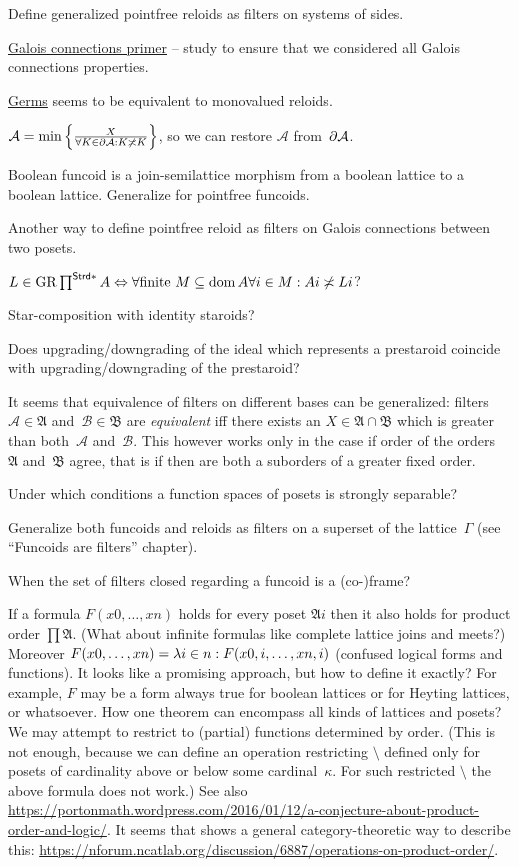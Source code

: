 \documentclass{amsart}
\begin{document}
Define generalized pointfree reloids as filters on systems of sides.

\href{https://www.math.ksu.edu/~strecker/primer.ps}{Galois connections primer} -- study to ensure that we considered all Galois connections properties.

\href{https://en.wikipedia.org/wiki/Germ (mathematics)}{Germs} seems to be equivalent to monovalued reloids.

$\mathcal{A} = \min\left\{ \frac{X}{\forall K\in\partial\mathcal{A}:K\not\asymp K}\right\}$, so we can restore $\mathcal{A}$ from~$\partial\mathcal{A}$.

Boolean funcoid is a join-semilattice morphism from a boolean lattice to a boolean lattice. Generalize for pointfree funcoids.

Another way to define pointfree reloid as filters on Galois connections between two posets.

$L \in \operatorname{GR} \prod^{\mathsf{Strd} \ast} A \Leftrightarrow \forall
\text{finite } M \subseteq \operatorname{dom} A \forall i \in M : A i \not\asymp L i$?

Star-composition with identity staroids?

Does upgrading/downgrading of the ideal which represents a prestaroid coincide with upgrading/downgrading of the prestaroid?

It seems that equivalence of filters on different bases can be generalized:
filters~$\mathcal{A}\in\mathfrak{A}$ and~$\mathcal{B}\in\mathfrak{B}$ are \emph{equivalent} iff
there exists an $X\in\mathfrak{A}\cap\mathfrak{B}$ which is greater than both~$\mathcal{A}$ and~$\mathcal{B}$.
This however works only in the case if order of the orders~$\mathfrak{A}$ and~$\mathfrak{B}$ agree,
that is if then are both a suborders of a greater fixed order.

Under which conditions a function spaces of posets is strongly separable?

Generalize both funcoids and reloids as filters on a superset of the lattice~$\Gamma$ (see ``Funcoids are filters'' chapter).

When the set of filters closed regarding a funcoid is a (co-)frame?

If a formula $F(x 0,\dots,x n)$ holds for every poset $\mathfrak{A} i$ then it also holds for product order $\prod\mathfrak{A}$.
(What about infinite formulas like complete lattice joins and meets?)
Moreover $F(x 0,\dots,x n) = \lambda i\in n:F(x {0,i},\dots,x {n,i})$ (confused logical forms and functions).
It looks like a promising approach, but how to define it exactly? For example, $F$ may be a form always true for boolean
lattices or for Heyting lattices, or whatsoever. How one theorem can encompass all kinds of lattices and posets?
We may attempt to restrict to (partial) functions determined by order.
(This is not enough, because we can define an operation restricting $\setminus$ defined only for posets
of cardinality above or below some cardinal~$\kappa$. For such restricted $\setminus$ the above formula does not work.)
See also \url{https://portonmath.wordpress.com/2016/01/12/a-conjecture-about-product-order-and-logic/}.
It seems that  shows a general category-theoretic way to describe this:
\url{https://nforum.ncatlab.org/discussion/6887/operations-on-product-order/}.
\end{document}
